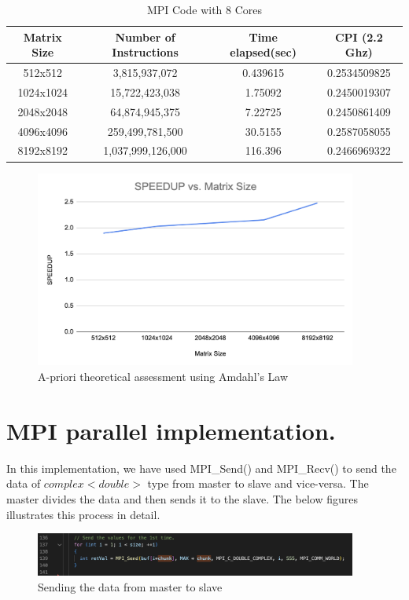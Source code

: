 \documentclass{article}
\begin{document}
\begin{table}[h]
\centering
\begin{tabular}{|c|c|c|c|}
\hline
Matrix Size & Number of Instructions & Time elapsed(sec) & CPI (2.2 Ghz) \\ 
\hline
512x512 & 3,815,937,072 & 0.439615 & 0.2534509825 \\ 
\hline
1024x1024 & 15,722,423,038 & 1.75092 & 0.2450019307 \\ 
\hline
2048x2048 & 64,874,945,375 & 7.22725 & 0.2450861409 \\ 
\hline
4096x4096 & 259,499,781,500 & 30.5155 & 0.2587058055 \\ 
\hline
8192x8192 & 1,037,999,126,000 & 116.396 & 0.2466969322 \\
\hline
\end{tabular}
\caption{MPI Code with 8 Cores}
\end{table}
\newpage
\begin{figure}[h]
    \centering
    \includegraphics[width=400px]{Amdahlv1.png}
    \caption{ A-priori theoretical assessment using Amdahl's Law }
    \label{fig:Amdahl}
\end{figure}

\section{MPI parallel implementation.}
In this implementation, we have used MPI\_Send() and MPI\_Recv() to send the data of $complex<double>$ type from master to slave and vice-versa. The master divides the data and then sends it to the slave. The below figures illustrates this process in detail.

\begin{figure}[h]
    \centering
    \includegraphics[width=400px]{mpisend1.png}
    \caption{Sending the data from master to slave}
    \label{fig:Sending}
\end{figure}
\end{document}
